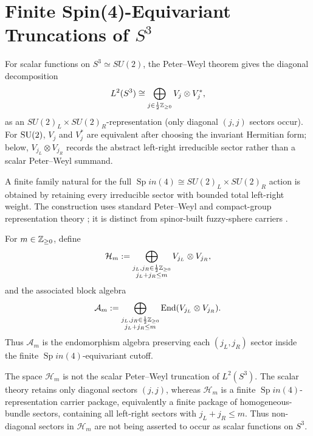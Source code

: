 \documentclass[11pt]{article}
\begin{document}
\section{\texorpdfstring{Finite Spin(4)-Equivariant Truncations of $S^3$}{Finite Spin(4)-Equivariant Truncations of S3}}
\label{p1:sec:fuzzy-sphere}

For scalar functions on $S^3\simeq SU(2)$, the Peter--Weyl theorem gives the diagonal decomposition
\[
L^2(S^3)\cong \bigoplus_{j\in \frac12\mathbb{Z}_{\ge0}} V_j\otimes V_j^*,
\]
as an \(SU(2)_L\times SU(2)_R\)-representation (only diagonal \((j,j)\) sectors occur).  For \(\mathrm{SU}(2)\), \(V_j\) and \(V_j^\ast\) are equivalent after choosing the invariant Hermitian form; below, \(V_{j_L}\otimes V_{j_R}\) records the abstract left-right irreducible sector rather than a scalar Peter--Weyl summand.

A finite family natural for the full
\(\operatorname{Sp}in(4)\cong SU(2)_L\times SU(2)_R\) action is obtained by retaining every
irreducible sector with bounded total left-right weight.  The construction
uses standard Peter--Weyl and compact-group representation theory
\cite{Peter1927,helgason1984groups,fulton1991representation}; it is distinct
from spinor-built fuzzy-sphere carriers
\cite{GuralnikRamgoolam2001,Ramgoolam2001,DolanOConnor2003,CastelinoLeeTaylor1998}.

\begin{definition}
\label{p1:def:spin4-truncation}
For \(m\in \mathbb{Z}_{\ge 0}\), define
\[
\mathcal H_m:=\bigoplus_{\substack{j_L,j_R\in \frac12\mathbb{Z}_{\ge0}\\ j_L+j_R\le m}} V_{j_L}\otimes V_{j_R},
\]
and the associated block algebra
\[
\mathcal A_m:=\bigoplus_{\substack{j_L,j_R\in \frac12\mathbb{Z}_{\ge0}\\ j_L+j_R\le m}}
\operatorname{End}(V_{j_L}\otimes V_{j_R}).
\]
Thus \(\mathcal A_m\) is the endomorphism algebra preserving each \((j_L,j_R)\) sector inside the finite
\(\operatorname{Sp}in(4)\)-equivariant cutoff.
\end{definition}

\begin{remark}
\label{p1:rem:scalar-vs-spin4}
The space \(\mathcal H_m\) is not the scalar Peter--Weyl truncation of \(L^2(S^3)\). The scalar theory retains only
diagonal sectors \((j,j)\), whereas \(\mathcal H_m\) is a finite \(\operatorname{Sp}in(4)\)-representation carrier package, equivalently a finite package of homogeneous-bundle sectors, containing all left-right sectors with
\(j_L+j_R\le m\).  Thus non-diagonal sectors in \(\mathcal H_m\) are not being asserted to occur as scalar functions on \(S^3\).
\end{remark}
\end{document}
